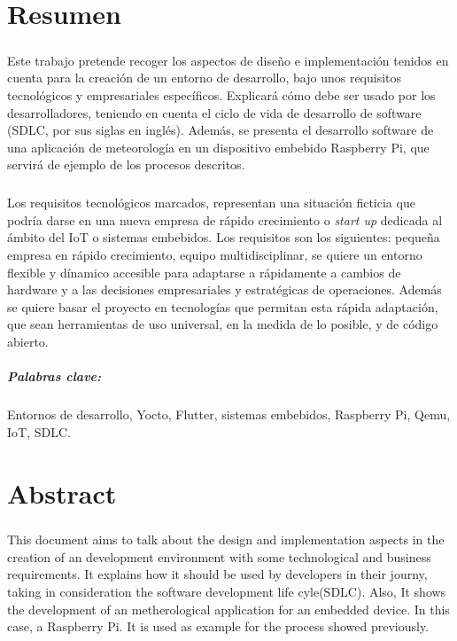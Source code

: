 \chapter{Resumen}

\paragraph{}Este trabajo pretende recoger los aspectos de diseño e implementación
tenidos en cuenta para la creación de un entorno de desarrollo, bajo unos requisitos
tecnológicos y empresariales específicos. Explicará cómo debe ser usado por los
desarrolladores, teniendo en cuenta el ciclo de vida de desarrollo de software (SDLC,
por sus siglas en inglés). Además, se presenta el desarrollo software de una aplicación
de meteorología en un dispositivo embebido Raspberry Pi, que servirá de ejemplo de
los procesos descritos.

\paragraph{}Los requisitos tecnológicos marcados, representan una situación ficticia
que podría darse en una nueva empresa de rápido crecimiento o \textit{start up} dedicada
al ámbito del IoT o sistemas embebidos. Los requisitos son los siguientes:
pequeña empresa en rápido crecimiento, equipo multidisciplinar, se quiere un entorno
flexible y dínamico accesible para adaptarse a rápidamente a cambios de hardware y
a las decisiones empresariales y estratégicas de operaciones. Además se quiere basar
el proyecto en tecnologías que permitan esta rápida adaptación, que sean herramientas
de uso universal, en la medida de lo posible, y de código abierto.

\paragraph{Palabras clave:} Entornos de desarrollo, Yocto, Flutter, sistemas embebidos,
 Raspberry Pi, Qemu, IoT, SDLC.

\chapter{Abstract}

\paragraph{}This document aims to talk about the design and implementation aspects in
the creation of an development environment with some technological and business requirements.
It explains how it should be used by developers in their journy, taking in consideration
the software development life cyle(SDLC). Also, It shows the development of an
metherological application for an embedded device. In this case, a Raspberry Pi. It
is used as example for the process showed previously.

